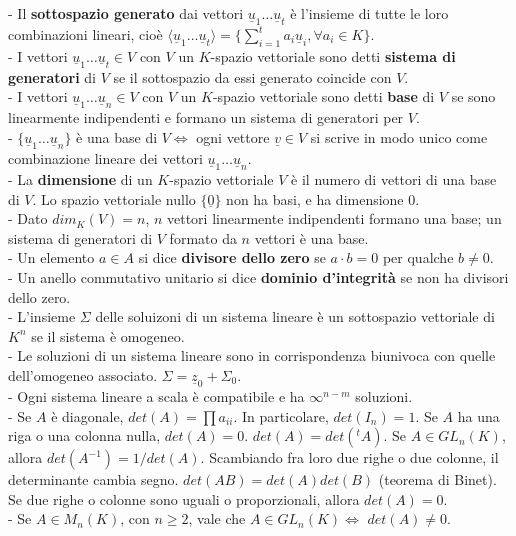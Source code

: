\documentclass[a4paper,10pt]{article} %
\renewcommand{\b}[1]{%
    {\textbf{#1}}}
\renewcommand{\v}[1]{%
    {\underline{#1}}}
\begin{document}
- Il \b{sottospazio generato} dai vettori $\v{u}_1 \ldots \v{u}_t$ è l'insieme di tutte le loro combinazioni lineari, cioè $\langle \v{u}_1 \ldots \v{u}_t \rangle = \{ \sum_{i=1}^t a_i\v{u}_i, \forall a_i \in K \}$.\\
- I vettori $\v{u}_1 \ldots \v{u}_t \in V$ con $V$ un $K$-spazio vettoriale sono detti \b{sistema di generatori} di $V$ se il sottospazio da essi generato coincide con $V$.\\
- I vettori $\v{u}_1 \ldots \v{u}_n \in V$ con $V$ un $K$-spazio vettoriale sono detti \b{base} di $V$ se sono linearmente indipendenti e formano un sistema di generatori per $V$.\\
- $\{\v{u}_1 \ldots \v{u}_n \}$ è una base di $V \Leftrightarrow$ ogni vettore $\v{v} \in V$ si scrive in modo unico come combinazione lineare dei vettori $\v{u}_1 \ldots \v{u}_n$.\\
- La \b{dimensione} di un $K$-spazio vettoriale $V$ è il numero di vettori di una base di $V$. Lo spazio vettoriale nullo $\{\v{0}\}$ non ha basi, e ha dimensione 0.\\
- Dato $dim_K(V) = n$, $n$ vettori linearmente indipendenti formano una base; un sistema di generatori di $V$ formato da $n$ vettori è una base.\\
- Un elemento $a \in A$ si dice \b{divisore dello zero} se $a\cdot b = 0$ per qualche $b \neq 0$.\\
- Un anello commutativo unitario si dice \b{dominio d'integrità} se non ha divisori dello zero.\\
- L'insieme $\Sigma$ delle soluizoni di un sistema lineare è un sottospazio vettoriale di $K^n$ se il sistema è omogeneo.\\
- Le soluzioni di un sistema lineare sono in corrispondenza biunivoca con quelle dell'omogeneo associato. $\Sigma = \v{z}_0 + \Sigma_0$.\\
- Ogni sistema lineare a scala è compatibile e ha $\infty^{n-m}$ soluzioni.\\
- Se $A$ è diagonale, $det(A) = \prod a_{ii}$. In particolare, $det(I_n) = 1$. \quad Se $A$ ha una riga o una colonna nulla, $det(A) = 0$. \quad $det(A) = det(^tA)$. \quad Se $A \in GL_n(K)$, allora $det(A^{-1}) = 1 / det(A)$. \quad Scambiando fra loro due righe o due colonne, il determinante cambia segno. \quad $det(AB) = det(A)det(B)$ (teorema di Binet). \quad Se due righe o colonne sono uguali o proporzionali, allora $det(A) = 0$.\\
- Se $A \in M_n(K)$, con $n \geq 2$, vale che $A \in GL_n(K) \Leftrightarrow$ $det(A) \neq 0$.\\
\end{document}
